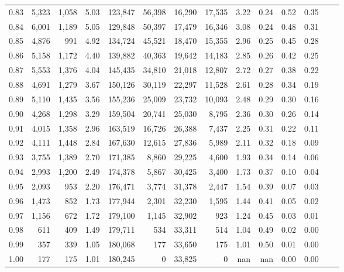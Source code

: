 \begin{tabular}{rrrrrrrrrrrrrr}
0.83 &  5,323 &  1,058 &    5.03 &  123,847 &   56,398 &  16,290 &  17,535 &  3.22 &  0.24 &  0.52 &      0.35 \\
0.84 &  6,001 &  1,189 &    5.05 &  129,848 &   50,397 &  17,479 &  16,346 &  3.08 &  0.24 &  0.48 &      0.31 \\
0.85 &  4,876 &    991 &    4.92 &  134,724 &   45,521 &  18,470 &  15,355 &  2.96 &  0.25 &  0.45 &      0.28 \\
0.86 &  5,158 &  1,172 &    4.40 &  139,882 &   40,363 &  19,642 &  14,183 &  2.85 &  0.26 &  0.42 &      0.25 \\
0.87 &  5,553 &  1,376 &    4.04 &  145,435 &   34,810 &  21,018 &  12,807 &  2.72 &  0.27 &  0.38 &      0.22 \\
0.88 &  4,691 &  1,279 &    3.67 &  150,126 &   30,119 &  22,297 &  11,528 &  2.61 &  0.28 &  0.34 &      0.19 \\
0.89 &  5,110 &  1,435 &    3.56 &  155,236 &   25,009 &  23,732 &  10,093 &  2.48 &  0.29 &  0.30 &      0.16 \\
0.90 &  4,268 &  1,298 &    3.29 &  159,504 &   20,741 &  25,030 &   8,795 &  2.36 &  0.30 &  0.26 &      0.14 \\
0.91 &  4,015 &  1,358 &    2.96 &  163,519 &   16,726 &  26,388 &   7,437 &  2.25 &  0.31 &  0.22 &      0.11 \\
0.92 &  4,111 &  1,448 &    2.84 &  167,630 &   12,615 &  27,836 &   5,989 &  2.11 &  0.32 &  0.18 &      0.09 \\
0.93 &  3,755 &  1,389 &    2.70 &  171,385 &    8,860 &  29,225 &   4,600 &  1.93 &  0.34 &  0.14 &      0.06 \\
0.94 &  2,993 &  1,200 &    2.49 &  174,378 &    5,867 &  30,425 &   3,400 &  1.73 &  0.37 &  0.10 &      0.04 \\
0.95 &  2,093 &    953 &    2.20 &  176,471 &    3,774 &  31,378 &   2,447 &  1.54 &  0.39 &  0.07 &      0.03 \\
0.96 &  1,473 &    852 &    1.73 &  177,944 &    2,301 &  32,230 &   1,595 &  1.44 &  0.41 &  0.05 &      0.02 \\
0.97 &  1,156 &    672 &    1.72 &  179,100 &    1,145 &  32,902 &     923 &  1.24 &  0.45 &  0.03 &      0.01 \\
0.98 &    611 &    409 &    1.49 &  179,711 &      534 &  33,311 &     514 &  1.04 &  0.49 &  0.02 &      0.00 \\
0.99 &    357 &    339 &    1.05 &  180,068 &      177 &  33,650 &     175 &  1.01 &  0.50 &  0.01 &      0.00 \\
1.00 &    177 &    175 &    1.01 &  180,245 &        0 &  33,825 &       0 &   nan &   nan &  0.00 &      0.00 \\
\bottomrule
\end{tabular}
